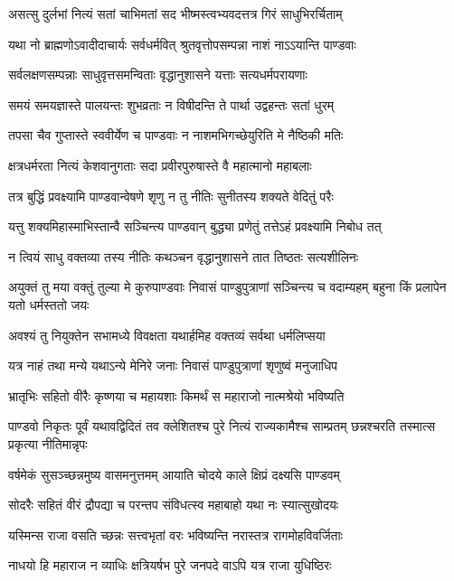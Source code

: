 \twolineshloka
{असत्सु दुर्लभां नित्यं सतां चाभिमतां सद}
{भीष्मस्त्वभ्यवदत्तत्र गिरं साधुभिरर्चिताम्}


\twolineshloka
{यथा नो ब्राह्मणोऽवादीदाचार्यः सर्वधर्मवित्}
{श्रुतवृत्तोपसम्पन्ना नाशं नाऽऽयान्ति पाण्डवाः}


\twolineshloka
{सर्वलक्षणसम्पन्नाः साधुवृत्तसमन्विताः}
{वृद्धानुशासने यत्ताः सत्यधर्मपरायणाः}


\twolineshloka
{समयं समयज्ञास्ते पालयन्तः शुभव्रताः}
{न विषीदन्ति ते पार्था उद्वहन्तः सतां धुरम्}


\twolineshloka
{तपसा चैव गुप्तास्ते स्ववीर्येण च पाण्डवाः}
{न नाशमभिगच्छेयुरिति मे नैष्ठिकी मतिः}


\twolineshloka
{क्षत्रधर्मरता नित्यं केशवानुगताः सदा}
{प्रवीरपुरुषास्ते वै महात्मानो महाबलाः}


\twolineshloka
{तत्र बुद्धिं प्रवक्ष्यामि पाण्डवान्वेषणे शृणु}
{न तु नीतिः सुनीतस्य शक्यते वेदितुं परैः}


\twolineshloka
{यत्तु शक्यमिहास्माभिस्तान्वै सञ्चिन्त्य पाण्डवान्}
{बुद्ध्या प्रणेतुं तत्तेऽहं प्रवक्ष्यामि निबोध तत्}


\twolineshloka
{न त्वियं साधु वक्तव्या तस्य नीतिः कथञ्चन}
{वृद्धानुशासने तात तिष्ठतः सत्यशीलिनः}


\threelineshloka
{अयुक्तं तु मया वक्तुं तुल्या मे कुरुपाण्डवाः}
{निवासं पाण्डुपुत्राणां सञ्चिन्त्य च वदाम्यहम्}
{बहुना किं प्रलापेन यतो धर्मस्ततो जयः}


\twolineshloka
{अवश्यं तु नियुक्तेन सभामध्ये विवक्षता}
{यथार्हमिह वक्तव्यं सर्वथा धर्मलिप्सया}


\twolineshloka
{यत्र नाहं तथा मन्ये यथाऽन्ये मेनिरे जनाः}
{निवासं पाण्डुपुत्राणां शृणुष्वं मनुजाधिप}


\twolineshloka
{भ्रातृभिः सहितो वीरैः कृष्णया च महायशाः}
{किमर्थं स महाराजो नात्मश्रेयो भविष्यति}


\threelineshloka
{पाण्डवो निकृतः पूर्वं यथावद्विदितं तव}
{क्लेशितश्च पुरे नित्यं राज्यकामैश्च साम्प्रतम्}
{छन्नश्चरति तस्मात्स प्रकृत्या नीतिमान्नृपः}


\twolineshloka
{वर्षमेकं सुसञ्च्छन्नमुष्य वासमनुत्तमम्}
{आयाति चोदये काले क्षिप्रं दक्ष्यसि पाण्डवम्}


\twolineshloka
{सोदरैः सहितं वीरं द्रौपद्या च परन्तप}
{संविधत्स्व महाबाहो यथा नः स्यात्सुखोदयः}


\twolineshloka
{यस्मिन्स राजा वसति च्छन्नः सत्त्वभृतां वरः}
{भविष्यन्ति नरास्तत्र रागमोहविवर्जिताः}


\twolineshloka
{नाधयो हि महाराज न व्याधिः क्षत्रियर्षभ}
{पुरे जनपदे वाऽपि यत्र राजा युधिष्ठिरः}


